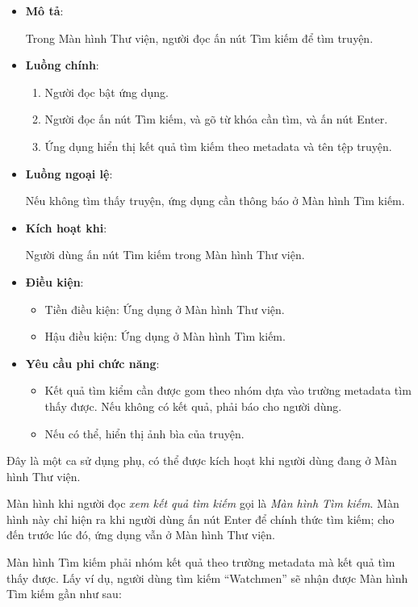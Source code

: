 \documentclass[
]{article}
\begin{document}
\begin{itemize}
\item
  \textbf{Mô tả}:

  Trong Màn hình Thư viện, người đọc ấn nút Tìm kiếm để tìm truyện.
\item
  \textbf{Luồng chính}:

  \begin{enumerate}
  \def\labelenumi{\arabic{enumi}.}
    \item
    Người đọc bật ứng dụng.
  \item
    Người đọc ấn nút Tìm kiếm, và gõ từ khóa cần tìm, và ấn nút Enter.
  \item
    Ứng dụng hiển thị kết quả tìm kiếm theo metadata và tên tệp truyện.
  \end{enumerate}
\item
  \textbf{Luồng ngoại lệ}:

  Nếu không tìm thấy truyện, ứng dụng cần thông báo ở Màn hình Tìm kiếm.
\item
  \textbf{Kích hoạt khi}:

  Người dùng ấn nút Tìm kiếm trong Màn hình Thư viện.
\item
  \textbf{Điều kiện}:

  \begin{itemize}
    \item
    Tiền điều kiện: Ứng dụng ở Màn hình Thư viện.
  \item
    Hậu điều kiện: Ứng dụng ở Màn hình Tìm kiếm.
  \end{itemize}
\item
  \textbf{Yêu cầu phi chức năng}:

  \begin{itemize}
    \item
    Kết quả tìm kiểm cần được gom theo nhóm dựa vào trường metadata tìm
    thấy được. Nếu không có kết quả, phải báo cho người dùng.
  \item
    Nếu có thể, hiển thị ảnh bìa của truyện.
  \end{itemize}
\end{itemize}

Đây là một ca sử dụng phụ, có thể được kích hoạt khi người dùng đang ở
Màn hình Thư viện.

Màn hình khi người đọc \emph{xem kết quả tìm kiếm} gọi là \emph{Màn hình
Tìm kiếm}. Màn hình này chỉ hiện ra khi người dùng ấn nút Enter để chính
thức tìm kiếm; cho đến trước lúc đó, ứng dụng vẫn ở Màn hình Thư viện.

Màn hình Tìm kiếm phải nhóm kết quả theo trường metadata mà kết quả tìm
thấy được. Lấy ví dụ, người dùng tìm kiếm ``Watchmen'' sẽ nhận được Màn
hình Tìm kiếm gần như sau:
\end{document}
